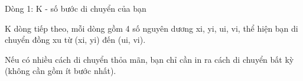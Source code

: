 Dòng 1: K - số bước di chuyển của bạn  

   K dòng tiếp theo, mỗi dòng gồm 4 số nguyên dương xi, yi, ui, vi, thể hiện bạn di chuyển đồng xu từ (xi, yi) đến (ui, vi).  

   Nếu có nhiều cách di chuyển thỏa mãn, bạn chỉ cần in ra cách di chuyển bất kỳ (không cần gồm ít bước nhất).